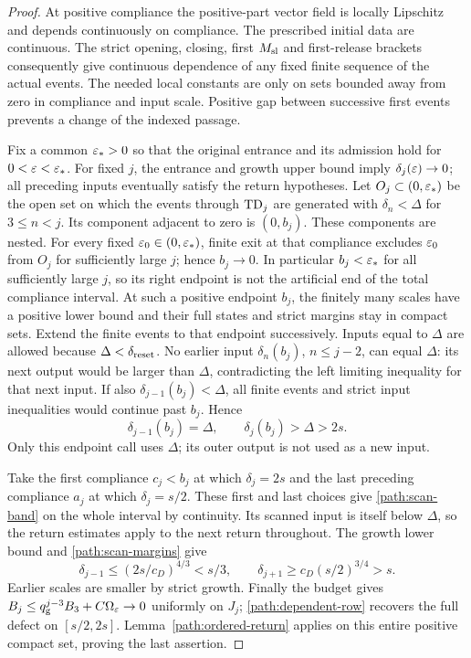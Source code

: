 \begin{proof}
At positive compliance the positive-part vector field is locally
Lipschitz and depends continuously on compliance.  The prescribed
initial data are continuous.  The strict opening, closing, first
$M_{\rm sl}$ and first-release brackets consequently give continuous
dependence of any fixed finite sequence of the actual events.
The needed local constants are only on sets bounded away from zero
in compliance and input scale.  Positive gap between successive
first events prevents a change of the indexed passage.

Fix a common $\varepsilon_*>0$ so that the original entrance and its
admission hold for $0<\varepsilon<\varepsilon_*$. For fixed $j$, the entrance
and growth upper bound imply $\delta_j(\varepsilon)\to0$; all preceding
inputs eventually satisfy the return hypotheses. Let $O_j\subset(0,\varepsilon_*)$ be the
open set on which the events through $\mathrm{TD}_j$ are generated with
$\delta_n<\Delta$ for $3\le n<j$. Its component adjacent to zero
is $(0,b_j)$. These components are nested. For every fixed
$\varepsilon_0\in(0,\varepsilon_*)$, finite exit at that compliance excludes
$\varepsilon_0$ from $O_j$ for sufficiently large $j$; hence $b_j\to0$.
In particular $b_j<\varepsilon_*$ for all sufficiently large $j$, so its
right endpoint is not the artificial end of the total compliance
interval. At such a positive endpoint $b_j$, the finitely many scales
have a positive lower bound and their full states and strict margins
stay in compact sets.  Extend the finite events to that endpoint
successively.  Inputs equal to $\Delta$ are allowed because
$\Delta<\delta_{\rm reset}$.  No earlier input
$\delta_n(b_j)$, $n\le j-2$, can equal $\Delta$: its next output
would be larger than $\Delta$, contradicting the left limiting
inequality for that next input.  If also
$\delta_{j-1}(b_j)<\Delta$, all finite events and strict input
inequalities would continue past $b_j$.  Hence
\[
 \delta_{j-1}(b_j)=\Delta,
 \qquad \delta_j(b_j)>\Delta>2s.
\]
Only this endpoint call uses $\Delta$; its outer output is not
used as a new input.

Take the first compliance $c_j<b_j$ at which $\delta_j=2s$ and
the last preceding compliance $a_j$ at which $\delta_j=s/2$.
These first and last choices give \eqref{path:scan-band} on the
whole interval by continuity. Its scanned input is
itself below $\Delta$, so the return estimates apply to the next return throughout.
The growth lower bound and \eqref{path:scan-margins} give
\[
 \delta_{j-1}\le(2s/c_D)^{4/3}<s/3,
 \qquad\delta_{j+1}\ge c_D(s/2)^{3/4}>s.
\]
Earlier scales are smaller by strict growth.  Finally the budget
gives $B_j\le q_{\rm g}^{j-3}B_3+C\Omega_\varepsilon\to0$ uniformly on
$J_j$; \eqref{path:dependent-row} recovers the full defect on
$[s/2,2s]$.  Lemma~\ref{path:ordered-return} applies on this entire
positive compact set, proving the last assertion.
\end{proof}


